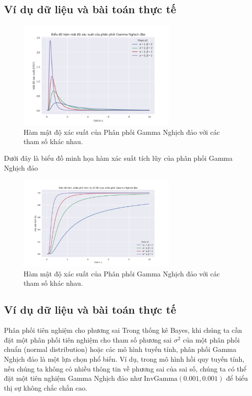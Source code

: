 	\subsection{Ví dụ dữ liệu và bài toán thực tế}
	\begin{figure}
		\centering
		\includegraphics[width=0.7\textwidth]{images/Inverse Gamma Distribution-PDF.png}
		\caption{Hàm mật độ xác suất của Phân phối Gamma Nghịch đảo với các tham số khác nhau.}
		\label{fig:Inverse Gamma Distribution-PDF}
	\end{figure}
	
	Dưới đây là biểu đồ minh họa hàm xác suất tích lũy của phân phối Gamma Nghịch đảo
	
		\begin{figure}[h!]
		\centering
		\includegraphics[width=0.7\textwidth]{images/Inverse Gamma Distribution-CDF.png} %
		\caption{Hàm mật độ xác suất của Phân phối Gamma Nghịch đảo với các tham số khác nhau.}
		\label{fig:Inverse Gamma Distribution-CDF}
	\end{figure}
	
	\subsection{Ví dụ dữ liệu và bài toán thực tế}
		Phân phối tiên nghiệm cho phương sai
		Trong thống kê Bayes, khi chúng ta cần đặt một phân phối tiên nghiệm cho tham số phương sai $\sigma^2$ của một phân phối chuẩn (normal distribution) hoặc các mô hình tuyến tính, phân phối Gamma Nghịch đảo là một lựa chọn phổ biến. Ví dụ, trong mô hình hồi quy tuyến tính, nếu chúng ta không có nhiều thông tin về phương sai của sai số, chúng ta có thể đặt một tiên nghiệm Gamma Nghịch đảo như $\text{InvGamma}(0.001, 0.001)$ để biểu thị sự không chắc chắn cao.
	
